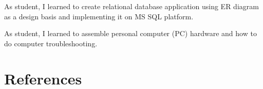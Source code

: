 \documentclass[10pt, a4paper]{moderncv}
\begin{document}
{
    \begin{scriptsize}
    As student, I learned to create relational database application using ER diagram as
    a design basis and implementing it on MS SQL platform.\\
    \end{scriptsize}
}
{
    \begin{scriptsize}
    As student, I learned to assemble personal computer (PC) hardware and how to
    do computer troubleshooting.\\
    \end{scriptsize}
}


\section{References}
{
}
\end{document}
